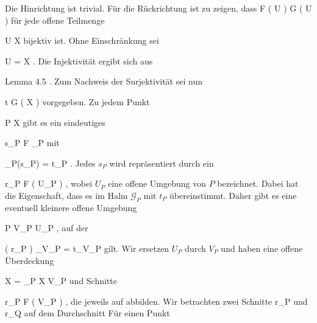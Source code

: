 {





Die Hinrichtung ist trivial. Für die Rückrichtung ist zu zeigen, dass
\maabbdisp {} { { \mathcal  F   }  \left(   U   \right) } { { \mathcal  G   }  \left(   U   \right)
} {}
für jede offene Teilmenge

\mavergleichskette
{\vergleichskette
{U
}
{ \subseteq }{ X
}
{  }{
}
{    }{
}
{   }{
}
}
{}{}{}
bijektiv ist. Ohne Einschränkung sei

\mavergleichskette
{\vergleichskette
{U
}
{ = }{ X
}
{  }{
}
{    }{
}
{   }{
}
}
{}{}{.}
Die Injektivität ergibt sich aus

Lemma 4.5
.
Zum Nachweis der Surjektivität sei nun

\mavergleichskette
{\vergleichskette
{t
}
{ \in }{ { \mathcal  G   }  \left(   X   \right)
}
{  }{
}
{    }{
}
{   }{
}
}
{}{}{}
vorgegeben. Zu jedem Punkt

\mavergleichskette
{\vergleichskette
{P
}
{ \in }{ X
}
{  }{
}
{    }{
}
{   }{
}
}
{}{}{}
gibt es ein eindeutiges

\mavergleichskettedisp
{\vergleichskette
{s_P
}
{ \in} { { \mathcal  F   }_P
}
{ } {
}
{ } {
}
{ } {
}
}
{}{}{}
mit

\mavergleichskettedisp
{\vergleichskette
{ \varphi_P(s_P)
}
{ =} { t_P
}
{ } {
}
{ } {
}
{ } {
}
}
{}{}{.}
Jedes $s_P$ wird repräsentiert durch ein

\mavergleichskettedisp
{\vergleichskette
{r_{P}
}
{ \in} { { \mathcal  F   }  \left(   U_P    \right)
}
{ } {
}
{ } {
}
{ } {
}
}
{}{}{,}
wobei $U_P$ eine offene Umgebung von $P$ bezeichnet. Dabei hat
 die Eigenschaft, dass es im Halm ${ \mathcal  G   }_P$ mit $t_P$ übereinstimmt. Daher gibt es eine eventuell kleinere offene Umgebung

\mavergleichskette
{\vergleichskette
{P
}
{ \in }{ V_P
}
{ \subseteq }{ U_P
}
{    }{
}
{   }{
}
}
{}{}{,}
auf der

\mavergleichskette
{\vergleichskette
{ \varphi \left(  r_P  \right) \vert_{V_P }
}
{ = }{ t\vert_{V_P }
}
{  }{
}
{    }{
}
{   }{
}
}
{}{}{}
gilt. Wir ersetzen $U_P$ durch $V_P$ und haben eine offene Überdeckung

\mavergleichskettedisp
{\vergleichskette
{X
}
{ =} { \bigcup_{P \in X} V_P
}
{ } {
}
{ } {
}
{ } {
}
}
{}{}{}
und Schnitte

\mavergleichskettedisp
{\vergleichskette
{r_P
}
{ \in} { { \mathcal  F   }  \left(   V_P    \right)
}
{ } {
}
{ } {
}
{ } {
}
}
{}{}{,}
die jeweils auf
 abbilden. Wir betrachten zwei Schnitte
\mathkor {} {r_P} {und} {r_Q} {}
auf dem Durchschnitt
 Für einen Punkt

}
